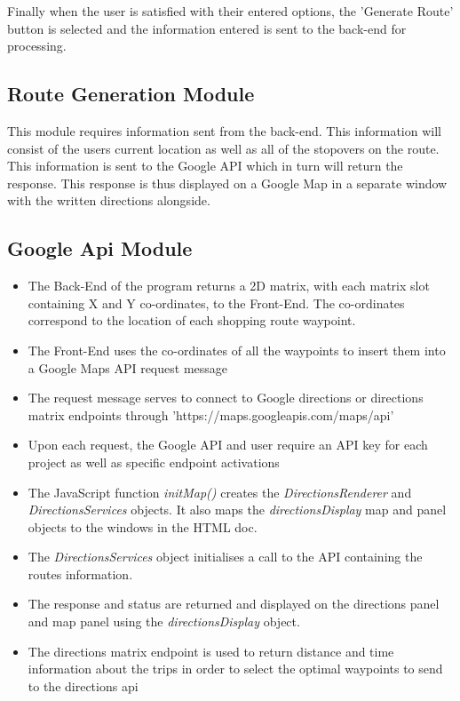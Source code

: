 \documentclass[10pt, a4paper, onecolumn]{scrartcl}
\begin{document}
		Finally when the user is satisfied with their entered options, the 'Generate Route' button is selected and the information entered is sent to the back-end for processing.
		
		\subsection{Route Generation Module}
		
		This module requires information sent from the back-end. This information will consist of the users current location as well as all of the stopovers on the route. This information is sent to the Google API which in turn will return the response. This response is thus displayed on a Google Map in a separate window with the written directions alongside.
		
		\subsection{Google Api Module}
		
				\begin{itemize}
					\item The Back-End of the program returns a 2D matrix, with each matrix slot containing X and Y co-ordinates, to the Front-End. The co-ordinates correspond to the location of each shopping route waypoint. 
					\item The Front-End uses the co-ordinates of all the waypoints to insert them into a Google Maps API request message
					\item The request message serves to connect to Google directions or directions matrix endpoints through 'https://maps.googleapis.com/maps/api'
					\item Upon each request, the Google API and user require an API key for each project as well as specific endpoint activations
					\item The JavaScript function \textit{initMap()} creates the \textit{DirectionsRenderer} and \textit{DirectionsServices} objects. It also maps the \textit{directionsDisplay} map and panel objects to the windows in the HTML doc.
					\item The \textit{DirectionsServices} object initialises a call to the API containing the routes information.
					\item The response and status are returned and displayed on the directions panel and map panel using the \textit{directionsDisplay} object.
					\item The directions matrix endpoint is used to return distance and time information about the trips in order to select the optimal waypoints to send to the directions api
				\end{itemize}
				
\end{document}
